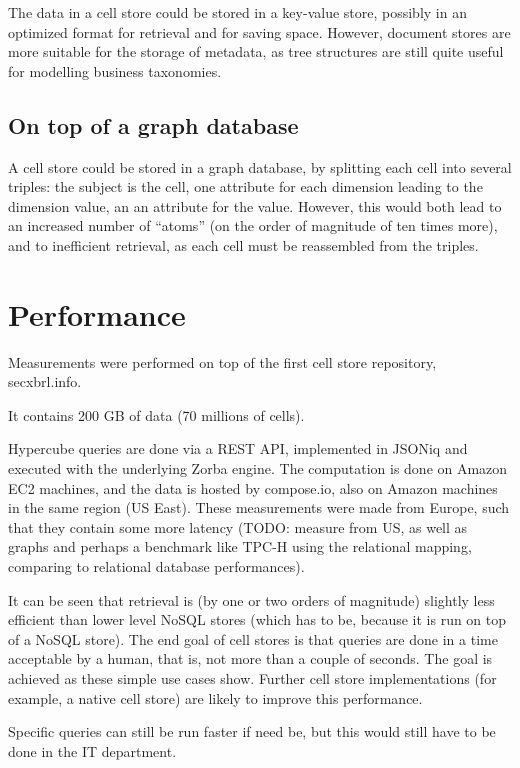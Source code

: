 \documentclass{vldb}
\begin{document}
The data in a cell store could be stored in a key-value store, possibly in an optimized format for retrieval and for saving space. However, document stores are more suitable for the storage of metadata, as tree structures are still quite useful for modelling business taxonomies.

\subsection{On top of a graph database}

A cell store could be stored in a graph database, by splitting each cell into several triples: the subject is the cell, one attribute for each dimension leading to the dimension value, an an attribute for the value. However, this would both lead to an increased number of ``atoms'' (on the order of magnitude of ten times more), and to inefficient retrieval, as each cell must be reassembled from the triples.

\section{Performance}
\label{section-performance}
Measurements were performed on top of the first cell store repository, secxbrl.info.

It contains 200 GB of data (70 millions of cells).

Hypercube queries are done via a REST API, implemented in JSONiq and executed with the underlying Zorba engine. The computation is done on Amazon EC2 machines, and the data is hosted by compose.io, also on Amazon machines in the same region (US East). These measurements were made from Europe, such that they contain some more latency (TODO: measure from US, as well as graphs and perhaps a benchmark like TPC-H using the relational mapping, comparing to relational database performances). 

It can be seen that retrieval is (by one or two orders of magnitude) slightly less efficient than lower level NoSQL stores (which has to be, because it is run on top of a NoSQL store). The end goal of cell stores is that queries are done in a time acceptable by a human, that is, not more than a couple of seconds. The goal is achieved as these simple use cases show. Further cell store implementations (for example, a native cell store) are likely to improve this performance.

Specific queries can still be run faster if need be, but this would still have to be done in the IT department.
\end{document}
